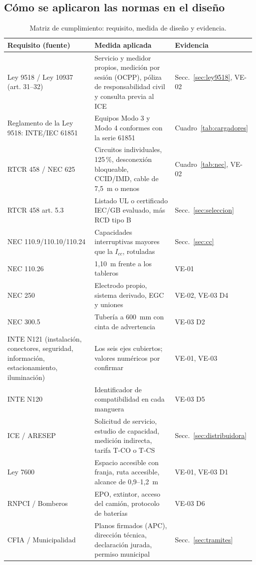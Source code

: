 \subsection{Cómo se aplicaron las normas en el diseño}
\begin{table}[H]
\centering\small
\caption{Matriz de cumplimiento: requisito, medida de diseño y evidencia.}\label{tab:cumplimiento}
\begin{tabularx}{\textwidth}{L{4.0cm}YL{2.6cm}}
\toprule
\textbf{Requisito (fuente)} & \textbf{Medida aplicada} & \textbf{Evidencia}\\
\midrule
Ley 9518 / Ley 10937 (art. 31--32) & Servicio y medidor propios, medición por sesión (OCPP), póliza de responsabilidad civil y consulta previa al ICE & Secc.~\ref{sec:ley9518}, VE-02\\
Reglamento de la Ley 9518: INTE/IEC 61851 & Equipos Modo 3 y Modo 4 conformes con la serie 61851 & Cuadro~\ref{tab:cargadores}\\
RTCR 458 / NEC 625 & Circuitos individuales, 125\,\%, desconexión bloqueable, CCID/IMD, cable de 7,5~m o menos & Cuadro~\ref{tab:nec}, VE-02\\
RTCR 458 art. 5.3 & Listado UL o certificado IEC/GB evaluado, más RCD tipo B & Secc.~\ref{sec:seleccion}\\
NEC 110.9/110.10/110.24 & Capacidades interruptivas mayores que la $I_{cc}$, rotuladas & Secc.~\ref{sec:cc}\\
NEC 110.26 & 1,10~m frente a los tableros & VE-01\\
NEC 250 & Electrodo propio, sistema derivado, EGC y uniones & VE-02, VE-03 D4\\
NEC 300.5 & Tubería a 600~mm con cinta de advertencia & VE-03 D2\\
INTE N121 (instalación, conectores, seguridad, información, estacionamiento, iluminación) & Los seis ejes cubiertos; valores numéricos por confirmar & VE-01, VE-03\\
INTE N120 & Identificador de compatibilidad en cada manguera & VE-03 D5\\
ICE / ARESEP & Solicitud de servicio, estudio de capacidad, medición indirecta, tarifa T-CO o T-CS & Secc.~\ref{sec:distribuidora}\\
Ley 7600 & Espacio accesible con franja, ruta accesible, alcance de 0,9--1,2~m & VE-01, VE-03 D1\\
RNPCI / Bomberos & EPO, extintor, acceso del camión, protocolo de baterías & VE-03 D6\\
CFIA / Municipalidad & Planos firmados (APC), dirección técnica, declaración jurada, permiso municipal & Secc.~\ref{sec:tramites}\\
\bottomrule
\end{tabularx}
\end{table}

